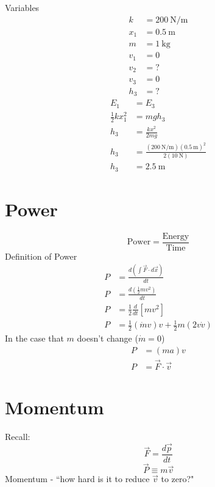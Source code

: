 \documentclass{article}
\begin{document}
Variables
\begin{align*}
	k & = \SI{200}{\newton \per \meter} \\
	x_1 & = \SI{0.5}{\meter} \\
	m & = \SI{1}{\kilogram} \\
	v_1 & = 0 \\
	v_2 & = ? \\
	v_3 & = 0 \\
	h_3 & = ?
\end{align*}
\begin{align*}
	E_1 & = E_3 \\
	\frac{1}{2}kx_1^2 & = mgh_3 \\
	h_3 & = \frac{kx^2}{2mg} \\
	h_3 & = \frac{(\SI{200}{\newton \per \meter})(\SI{0.5}{\meter})^2}{2(\SI{10}{\newton})} \\
	h_3 & = \SI{2.5}{\meter}
\end{align*}

\section{Power}

\begin{equation}
	\text{Power} = \frac{\text{Energy}}{\text{Time}}
\end{equation}
Definition of Power
\begin{align*}
	P & = \frac{d \left( \int \vec{F} \cdot d\vec{x} \right)}{dt} \\
	P & = \frac{d \left( \frac{1}{2}mv^2 \right)}{dt} \\
	P & = \frac{1}{2} \frac{d}{dt} \left[ mv^2 \right] \\
	P & = \frac{1}{2} (\dot{m}v)v + \frac{1}{2}m(2v\dot{v})
\end{align*}
In the case that $ m $ doesn't change ($ \dot{m} = 0 $)
\begin{align*}
	P & = (ma)v \\
	P & = \vec{F} \cdot \vec{v}
\end{align*}

\section{Momentum}

Recall:
\begin{equation}
	\vec{F} = \frac{d\vec{p}}{dt}
\end{equation}
\begin{equation}
	\vec{P} \equiv m\vec{v}
\end{equation}
Momentum - ``how hard is it to reduce $ \vec{v} $ to zero?"
\end{document}
